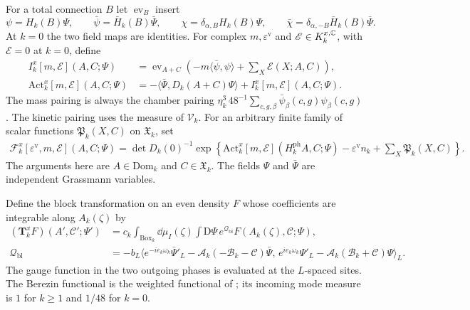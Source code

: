 For a total connection $B$ let $\operatorname{ev}_B$
insert
\[
 \psi=H_k(B)\Psi,\qquad
 \bar\psi=\bar H_k(B)\bar\Psi,\qquad
 \chi=\delta_{\alpha,B}H_k(B)\Psi,\qquad
 \bar\chi=\delta_{\alpha,-B}\bar H_k(B)\bar\Psi.
\]
At $k=0$ the two field maps are identities.
For complex $m,\varepsilon^{\mathrm v}$ and
$\mathscr E\in K_k^{x,\mathbb C}$, with $\mathscr E=0$
at $k=0$, define
\begin{equation}\label{eq:rg-step-interaction-action}
 \begin{split}
 I_k^x[m,\mathscr E](A,C;\Psi)
     &=\operatorname{ev}_{A+C}
         \left(-m\langle\bar\psi,\psi\rangle
                               +\sum_X\mathscr E(X;A,C)\right),\\
 \mathrm{Act}_k^x[m,\mathscr E](A,C;\Psi)
     &=-\langle\bar\Psi,D_k(A+C)\Psi\rangle
                                  +I_k^x[m,\mathscr E](A,C;\Psi).
 \end{split}
\end{equation}
The mass pairing is always the chamber pairing
$\eta_k^3\,48^{-1}\sum_{c,g,\beta}\bar\psi_\beta(c,g)\psi_\beta(c,g)$.
The kinetic pairing uses the measure of $\mathscr V_k$.
For an arbitrary finite family of scalar functions
$\mathfrak P_k(X,C)$ on $\mathfrak X_k$, set
\begin{equation}\label{eq:rg-step-input-density}
 \begin{split}
 \mathscr F_k^x[\varepsilon^{\mathrm v},m,\mathscr E](A,C;\Psi)
   =\det D_k(0)^{-1}\exp\left\{
         \mathrm{Act}_k^x[m,\mathscr E](H_k^{\mathrm{ph}}A,C;\Psi)
                   -\varepsilon^{\mathrm v}n_k
                              +\sum_X\mathfrak P_k(X,C)\right\}.
 \end{split}
\end{equation}
The arguments here are $A\in\mathrm{Dom}_k$ and
$C\in\mathfrak X_k$. The fields $\Psi$ and $\bar\Psi$
are independent Grassmann variables.

Define the block transformation on an even density
$F$ whose coefficients are integrable along
$A_k(\zeta)$ by
\begin{equation}\label{eq:rg-step-block-transformation}
 \begin{split}
 (\mathbf T_k^xF)(A',\mathscr C';\Psi')
  &=c_k\int_{\mathrm{Box}_k}\dd\mu_I(\zeta)
                       \int\mathrm D\Psi\,e^{\mathcal Q_{\mathrm{bl}}}
                                         F(A_k(\zeta),\mathscr C;\Psi),\\
 \mathcal Q_{\mathrm{bl}}
  &=-b_L\big\langle
       e^{-ie_k\omega_k}\bar\Psi'_L
                    -\mathcal A_k(-\mathscr B_k-\mathscr C)\bar\Psi,\,
       e^{ie_k\omega_k}\Psi'_L
                    -\mathcal A_k(\mathscr B_k+\mathscr C)\Psi
                                                \big\rangle_L.
 \end{split}
\end{equation}
The gauge function in the two outgoing phases is
evaluated at the $L$-spaced sites.
The Berezin functional is the weighted functional
of ; its incoming mode
measure is $1$ for $k\ge1$ and $1/48$ for $k=0$.

